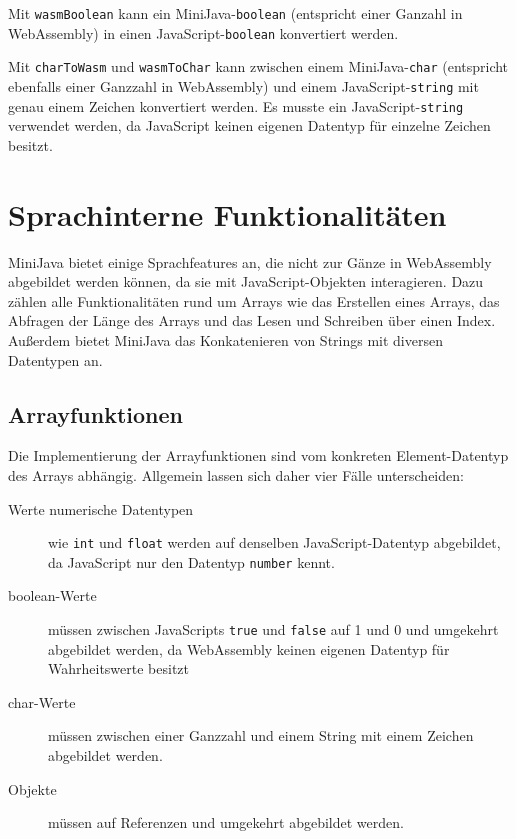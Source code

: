 Mit \lstinline{wasmBoolean} kann ein MiniJava-\lstinline{boolean} (entspricht einer Ganzahl in WebAssembly) in einen JavaScript-\lstinline{boolean} konvertiert werden.

Mit \lstinline{charToWasm} und \lstinline{wasmToChar} kann zwischen einem MiniJava-\lstinline{char} (entspricht ebenfalls einer Ganzzahl in WebAssembly) und einem JavaScript-\lstinline{string} mit genau einem Zeichen konvertiert werden.
Es musste ein JavaScript-\lstinline{string} verwendet werden, da JavaScript keinen eigenen Datentyp für einzelne Zeichen besitzt.

\section{Sprachinterne Funktionalitäten}

MiniJava bietet einige Sprachfeatures an, die nicht zur Gänze in WebAssembly abgebildet werden können, da sie mit JavaScript-Objekten interagieren. Dazu zählen alle Funktionalitäten rund um Arrays wie das Erstellen eines Arrays, das Abfragen der Länge des Arrays und das Lesen und Schreiben über einen Index. Außerdem bietet MiniJava das Konkatenieren von Strings mit diversen Datentypen an.

\subsection{Arrayfunktionen}

Die Implementierung der Arrayfunktionen sind vom konkreten Element-Datentyp des Arrays abhängig. Allgemein lassen sich daher vier Fälle unterscheiden:

\begin{description}
    \item[Werte numerische Datentypen] wie \lstinline{int} und \lstinline{float} werden auf denselben JavaScript-Daten\-typ abgebildet, da JavaScript nur den Datentyp \lstinline{number} kennt.
    \item[boolean-Werte] müssen zwischen JavaScripts \lstinline{true} und \lstinline{false} auf 1 und 0 und umgekehrt abgebildet werden, da WebAssembly keinen eigenen Datentyp für Wahrheitswerte besitzt
    \item[char-Werte] müssen zwischen einer Ganzzahl und einem String mit einem Zeichen abgebildet werden.
    \item[Objekte] müssen auf Referenzen und umgekehrt abgebildet werden. 
\end{description}

